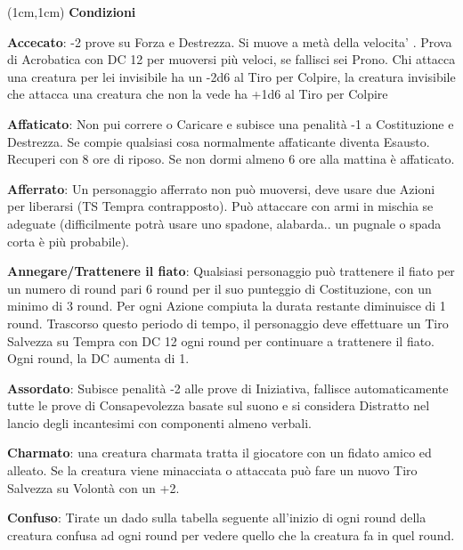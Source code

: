 \documentclass[a4paper,12 pt,openany]{book}
\begin{document}
	\center

	\begin{textblock*}{19 cm}(1cm,1cm) %
		\flushleft
		\textbf{Condizioni}\\
		\footnotesize

		\begin{multicols}{2}

\textbf{Accecato}: -2 prove su Forza e Destrezza.
Si muove a metà della velocita' . Prova di Acrobatica con DC 12 per muoversi più veloci, se fallisci sei Prono.
Chi attacca una creatura per lei invisibile ha un -2d6 al Tiro per Colpire, la creatura invisibile che attacca una creatura che non la vede ha +1d6 al Tiro per Colpire


\textbf{Affaticato}: Non pui correre o Caricare e subisce una penalità -1 a Costituzione e Destrezza. Se compie qualsiasi cosa normalmente affaticante diventa Esausto.
Recuperi con 8 ore di riposo. Se non dormi almeno 6 ore alla mattina è affaticato.

\textbf{Afferrato}: Un personaggio afferrato non può muoversi, deve usare due Azioni per liberarsi (TS Tempra contrapposto). Può attaccare con armi in mischia se adeguate (difficilmente potrà usare uno spadone, alabarda.. un pugnale o spada corta è più probabile).

\textbf{Annegare/Trattenere il fiato}:  Qualsiasi personaggio può trattenere il fiato per un numero di round pari 6 round per il suo punteggio di Costituzione, con un minimo di 3 round. Per ogni Azione compiuta la durata restante diminuisce di 1 round. Trascorso questo periodo di tempo, il personaggio deve effettuare un Tiro Salvezza su Tempra con DC 12 ogni round per continuare a trattenere il fiato. Ogni round, la DC aumenta di 1.

\textbf{Assordato}: Subisce penalità -2 alle prove di Iniziativa, fallisce automaticamente tutte le prove di Consapevolezza basate sul suono e si considera Distratto nel lancio degli incantesimi con componenti almeno verbali.

\textbf{Charmato}: una creatura charmata tratta il giocatore con un fidato amico ed alleato. Se la creatura viene minacciata o attaccata può fare un nuovo Tiro Salvezza su Volontà con un +2.

\textbf{Confuso}:  Tirate un dado sulla tabella seguente all'inizio di ogni round della creatura confusa ad ogni round per vedere quello che la creatura fa in quel round.


\end{multicols}
\end{textblock*}
\end{document}
